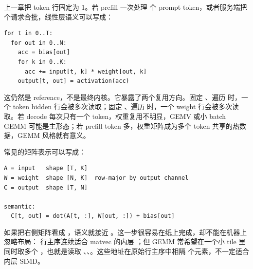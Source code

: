 上一章把 token 行固定为 1。若 prefill 一次处理  个 prompt token，或者服务端把  个请求合批，线性层语义可以写成：

\begin{lstlisting}[numbers=none,caption={多 token 版线性层 reference 语义}]
for t in 0..T:
  for out in 0..N:
    acc = bias[out]
    for k in 0..K:
      acc += input[t, k] * weight[out, k]
    output[t, out] = activation(acc)
\end{lstlisting}

这仍然是 reference，不是最终内核。它暴露了两个复用方向。固定 、遍历  时，一个 token hidden 行会被多次读取；固定 、遍历  时，一个 weight 行会被多次读取。若 decode 每次只有一个 token，权重复用不明显，GEMV 或小 batch GEMM 可能是主形态；若 prefill token 多，权重矩阵成为多个 token 共享的热数据，GEMM 风格就有意义。

常见的矩阵表示可以写成：

\begin{lstlisting}[numbers=none,caption={第一层的矩阵形状}]
A = input   shape [T, K]
W = weight  shape [N, K]  row-major by output channel
C = output  shape [T, N]

semantic:
  C[t, out] = dot(A[t, :], W[out, :]) + bias[out]
\end{lstlisting}

如果把右侧矩阵看成 ，语义就接近 。这一步很容易在纸上完成，却不能在机器上忽略布局： 行主序连续适合 matvec 的内层 ；但 GEMM 常希望在一个小 tile 里同时取多个 ，也就是读取 、、。这些地址在原始行主序中相隔  个元素，不一定适合内层 SIMD。


